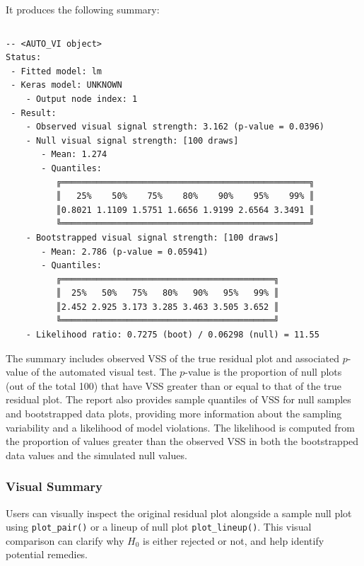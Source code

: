 \documentclass[
doublespace,
  times]{anzsauth}
\newenvironment{Shaded}{\begin{snugshade}}{\end{snugshade}}
\newcommand{\FunctionTok}[1]{\textcolor[rgb]{0.28,0.35,0.67}{#1}}
\newcommand{\NormalTok}[1]{\textcolor[rgb]{0.00,0.23,0.31}{#1}}
\newcommand{\SpecialCharTok}[1]{\textcolor[rgb]{0.37,0.37,0.37}{#1}}
\begin{document}
It produces the following summary:

\begin{verbatim}
\end{verbatim}

\begin{verbatim}
-- <AUTO_VI object>
Status:
 - Fitted model: lm
 - Keras model: UNKNOWN
    - Output node index: 1
 - Result:
    - Observed visual signal strength: 3.162 (p-value = 0.0396)
    - Null visual signal strength: [100 draws]
       - Mean: 1.274
       - Quantiles: 
          ╔═════════════════════════════════════════════════╗
          ║   25%    50%    75%    80%    90%    95%    99% ║
          ║0.8021 1.1109 1.5751 1.6656 1.9199 2.6564 3.3491 ║
          ╚═════════════════════════════════════════════════╝
    - Bootstrapped visual signal strength: [100 draws]
       - Mean: 2.786 (p-value = 0.05941)
       - Quantiles: 
          ╔══════════════════════════════════════════╗
          ║  25%   50%   75%   80%   90%   95%   99% ║
          ║2.452 2.925 3.173 3.285 3.463 3.505 3.652 ║
          ╚══════════════════════════════════════════╝
    - Likelihood ratio: 0.7275 (boot) / 0.06298 (null) = 11.55 
\end{verbatim}

The summary includes observed VSS of the true residual plot and
associated \(p\)-value of the automated visual test. The \(p\)-value is
the proportion of null plots (out of the total 100) that have VSS
greater than or equal to that of the true residual plot. The report also
provides sample quantiles of VSS for null samples and bootstrapped data
plots, providing more information about the sampling variability and a
likelihood of model violations. The likelihood is computed from the
proportion of values greater than the observed VSS in both the
bootstrapped data values and the simulated null values.

\subsubsection{Visual Summary}\label{sec-autovi-visual}

Users can visually inspect the original residual plot alongside a sample
null plot using \texttt{plot\_pair()} or a lineup of null plot
\texttt{plot\_lineup()}. This visual comparison can clarify why \(H_0\)
is either rejected or not, and help identify potential remedies.

\begin{Shaded}
\end{Shaded}
\end{document}

